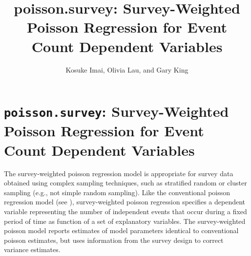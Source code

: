 

\title{poisson.survey: Survey-Weighted Poisson Regression for Event Count Dependent Variables}
\author{Kosuke Imai, Olivia Lau, and Gary King}

 


\section{{\tt poisson.survey}: Survey-Weighted Poisson Regression for Event Count Dependent Variables}
\label{poisson.survey}

The survey-weighted poisson regression model is appropriate for 
survey data obtained using complex sampling techniques, such as 
stratified random or cluster sampling (e.g., not simple random 
sampling).  Like the conventional poisson regression model (see 
), survey-weighted poisson regression specifies a 
dependent variable representing the number of independent events 
that occur during a fixed period of time as function of a set of 
explanatory variables.  The survey-weighted poisson model reports 
estimates of model parameters identical to conventional poisson 
estimates, but uses information from the survey design to correct 
variance estimates.

